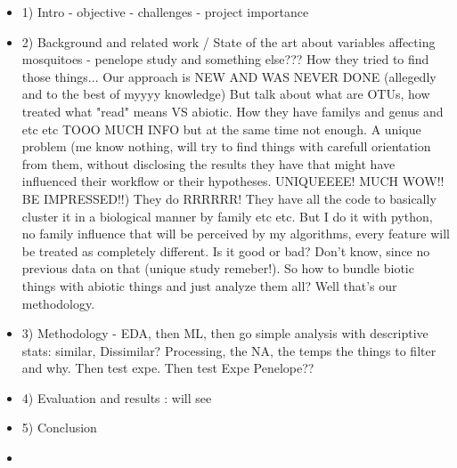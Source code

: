 \documentclass[acmlarge]{acmart}
\begin{document}
\begin{itemize}
    \item 1) Intro - objective - challenges - project importance 
    \item 2) Background and related work / State of the art about variables affecting mosquitoes - penelope study and something else??? How they tried to find those things... Our approach is NEW AND WAS NEVER DONE (allegedly and to the best of myyyy knowledge) But talk about what are OTUs, how treated what "read" means VS abiotic. How they have familys and genus and etc etc TOOO MUCH INFO but at the same time not enough. A unique problem (me know nothing, will try to find things with carefull orientation from them, without disclosing the results they have that might have influenced their workflow or their hypotheses. UNIQUEEEE! MUCH WOW!! BE IMPRESSED!!) They do RRRRRR! They have all the code to basically cluster it in a biological manner by family etc etc. But I do it with python, no family influence that will be perceived by my algorithms, every feature will be treated as completely different. Is it good or bad? Don't know, since no previous data on that (unique study remeber!). So how to bundle biotic things with abiotic things and just analyze them all? Well that's our methodology. 
    \item 3) Methodology - EDA, then ML, then go simple analysis with descriptive stats: similar, Dissimilar? Processing, the NA, the temps the things to filter and why. Then test expe. Then test Expe Penelope?? 
    \item 4) Evaluation and results : will see
    \item 5) Conclusion
    \item 
\end{itemize}
\end{document}
